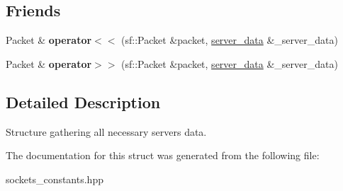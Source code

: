 \subsection*{Friends}
\begin{DoxyCompactItemize}
\item 
\mbox{\label{structserver__data_a0daeff97160e590a6f61560ce90d4a61}} 
Packet \& {\bfseries operator$<$$<$} (sf\+::\+Packet \&packet, \hyperlink{structserver__data}{server\+\_\+data} \&\+\_\+server\+\_\+data)
\item 
\mbox{\label{structserver__data_aa0aa87882e9e007247e2c096a7a493e3}} 
Packet \& {\bfseries operator$>$$>$} (sf\+::\+Packet \&packet, \hyperlink{structserver__data}{server\+\_\+data} \&\+\_\+server\+\_\+data)
\end{DoxyCompactItemize}


\subsection{Detailed Description}
Structure gathering all necessary server\textquotesingle{}s data. 

The documentation for this struct was generated from the following file\+:\begin{DoxyCompactItemize}
\item 
sockets\+\_\+constants.\+hpp\end{DoxyCompactItemize}
